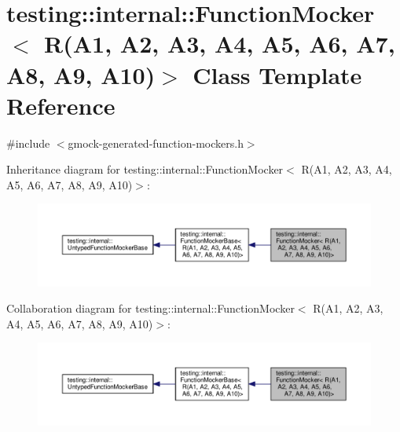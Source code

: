 \hypertarget{classtesting_1_1internal_1_1FunctionMocker_3_01R_07A1_00_01A2_00_01A3_00_01A4_00_01A5_00_01A6_0079295c90ba14a714e84d5a856a5b50dd}{}\section{testing\+:\+:internal\+:\+:Function\+Mocker$<$ R(A1, A2, A3, A4, A5, A6, A7, A8, A9, A10)$>$ Class Template Reference}
\label{classtesting_1_1internal_1_1FunctionMocker_3_01R_07A1_00_01A2_00_01A3_00_01A4_00_01A5_00_01A6_0079295c90ba14a714e84d5a856a5b50dd}


{\ttfamily \#include $<$gmock-\/generated-\/function-\/mockers.\+h$>$}



Inheritance diagram for testing\+:\+:internal\+:\+:Function\+Mocker$<$ R(A1, A2, A3, A4, A5, A6, A7, A8, A9, A10)$>$\+:
\nopagebreak
\begin{figure}[H]
\begin{center}
\leavevmode
\includegraphics[width=350pt]{classtesting_1_1internal_1_1FunctionMocker_3_01R_07A1_00_01A2_00_01A3_00_01A4_00_01A5_00_01A6_007afc3ae8e923b3ee809060b6741a03ef}
\end{center}
\end{figure}


Collaboration diagram for testing\+:\+:internal\+:\+:Function\+Mocker$<$ R(A1, A2, A3, A4, A5, A6, A7, A8, A9, A10)$>$\+:
\nopagebreak
\begin{figure}[H]
\begin{center}
\leavevmode
\includegraphics[width=350pt]{classtesting_1_1internal_1_1FunctionMocker_3_01R_07A1_00_01A2_00_01A3_00_01A4_00_01A5_00_01A6_008f8b249ed8a403a1830a3f61f13ab625}
\end{center}
\end{figure}
